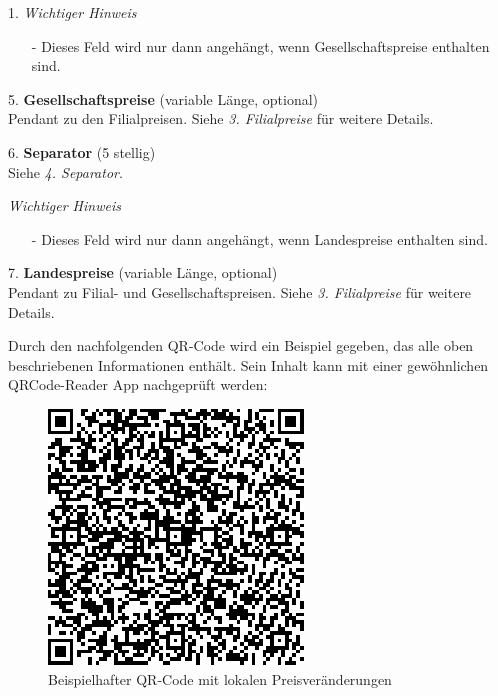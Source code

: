 \begin{seToplist}{1. }
	\textit{Wichtiger Hinweis}
		\begin{itemize}
		\item[-] Dieses Feld wird nur dann angehängt, wenn Gesellschaftspreise enthalten sind.
		\end{itemize}
		
\item[5. ]\textbf{Gesellschaftspreise} (variable Länge, optional)\\
	Pendant zu den Filialpreisen. Siehe \textit{3. Filialpreise} für weitere Details.
	
\item[6. ]\textbf{Separator} (5 stellig)\\
	Siehe \textit{4. Separator}.
	
	\textit{Wichtiger Hinweis}
			\begin{itemize}
			\item[-] Dieses Feld wird nur dann angehängt, wenn Landespreise enthalten sind.
			\end{itemize}
			
\item[7. ]\textbf{Landespreise} (variable Länge, optional)\\
	Pendant zu Filial- und Gesellschaftspreisen. Siehe \textit{3. Filialpreise} für weitere Details.
\end{seToplist}

Durch den nachfolgenden QR-Code wird ein Beispiel gegeben, das alle oben beschriebenen Informationen enthält. Sein Inhalt kann mit einer gewöhnlichen QRCode-Reader App nachgeprüft werden:

\begin{figure}[H]
\includegraphics[scale=1]{res/qr_eingang}
\caption{Beispielhafter QR-Code mit lokalen Preisveränderungen}
\end{figure}

